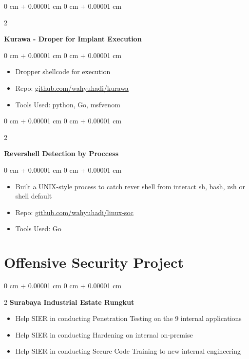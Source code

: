 \documentclass[10pt, letterpaper]{article}
\newenvironment{highlights}{
    \begin{itemize}[
        topsep=0.10 cm,
        parsep=0.10 cm,
        partopsep=0pt,
        itemsep=0pt,
        leftmargin=0 cm + 10pt
    ]
}{
    \end{itemize}
} %
\newenvironment{onecolentry}{
    \begin{adjustwidth}{
        0 cm + 0.00001 cm
    }{
        0 cm + 0.00001 cm
    }
}{
    \end{adjustwidth}
} %
\newenvironment{twocolentry}[2][]{
    \onecolentry
    \def\secondColumn{#2}
    \setcolumnwidth{\fill, 4.5 cm}
    \begin{paracol}{2}
}{
    \switchcolumn \raggedleft \secondColumn
    \end{paracol}
    \endonecolentry
} %
\begin{document}
	\begin{twocolentry}{
			
		}
		\textbf{Kurawa - Droper for Implant Execution }\end{twocolentry}
	
	\vspace{0.10 cm}
	\begin{onecolentry}
		\begin{highlights}
			\item Dropper shellcode for execution 
			\item Repo: \href{https://github.com/wahyuhadi/kurawa}{github.com/wahyuhadi/kurawa} 
			\item Tools Used: python, Go, msfvenom
		\end{highlights}
	\end{onecolentry}

        \vspace{0.2 cm}

        \begin{twocolentry}{
            
        }
            \textbf{Revershell Detection by Proccess}\end{twocolentry}

        \vspace{0.10 cm}
        \begin{onecolentry}
            \begin{highlights}
                \item Built a UNIX-style process to catch rever shell from interact sh, bash, zsh or shell default
                \item Repo: \href{https://github.com/wahyuhadi/linux-soc}{github.com/wahyuhadi/linux-soc}
                \item Tools Used: Go
            \end{highlights}
        \end{onecolentry}


	\section{Offensive Security Project}
		  \vspace{0.35 cm}
		\begin{samepage}
			\begin{twocolentry}{}{\textbf{Surabaya Industrial Estate Rungkut}}
			\end{twocolentry}

			\begin{highlights}
				\item Help SIER in conducting Penetration Testing on the 9 internal applications
				\item Help SIER in conducting Hardening on internal on-premise
				\item Help SIER in conducting Secure Code Training to new internal engineering
			\end{highlights}

		\end{samepage}
		
\end{document}

